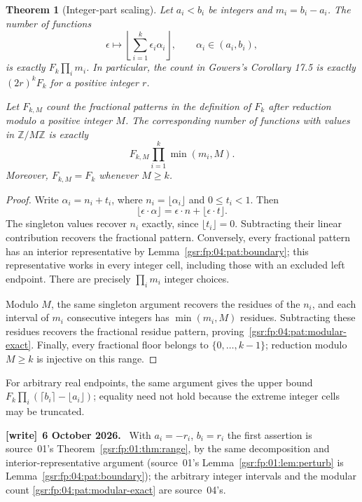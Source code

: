 \documentclass[11pt,letterpaper]{article}
\numberwithin{equation}{section}
\newtheorem{theorem}{Theorem}[section]
\theoremstyle{definition}
\theoremstyle{remark}
\newcommand{\1}{\mathbf 1}
\newenvironment{writenote}[1][]{\par\smallskip\begingroup\small
 \noindent\textbf{[write]}\if\relax\detokenize{#1}\relax\else~\textbf{#1.}\fi\ }%
 {\par\endgroup\smallskip}
\begin{document}
\begin{theorem}[Integer-part scaling]\label{gsr:fp:04:pat:scaling}
Let $a_i<b_i$ be integers and $m_i=b_i-a_i$. The number of functions
\[
 \epsilon\longmapsto\left\lfloor\sum_{i=1}^k\epsilon_i\alpha_i\right\rfloor,
 \qquad \alpha_i\in(a_i,b_i),
\]
is exactly $F_k\prod_i m_i$. In particular, the count in Gowers's
Corollary 17.5 is exactly $(2r)^kF_k$ for a positive integer $r$.

Let $F_{k,M}$ count the fractional patterns in the definition of $F_k$
after reduction modulo a positive integer $M$. The corresponding number
of functions with values in $\mathbb Z/M\mathbb Z$ is exactly
\begin{equation}\label{gsr:fp:04:pat:modular-exact}
 F_{k,M}\prod_{i=1}^k\min(m_i,M).
\end{equation}
Moreover, $F_{k,M}=F_k$ whenever $M\ge k$.
\end{theorem}
\begin{proof}
Write $\alpha_i=n_i+t_i$, where $n_i=\lfloor\alpha_i\rfloor$ and
$0\le t_i<1$. Then
\[
 \lfloor\epsilon\cdot\alpha\rfloor
   =\epsilon\cdot n+\lfloor\epsilon\cdot t\rfloor.
\]
The singleton values recover $n_i$ exactly, since
$\lfloor t_i\rfloor=0$. Subtracting their linear contribution recovers
the fractional pattern. Conversely, every fractional pattern has an
interior representative by Lemma~\ref{gsr:fp:04:pat:boundary}; this representative
works in every integer cell, including those with an excluded left
endpoint. There are precisely $\prod_i m_i$ integer choices.

Modulo $M$, the same singleton argument recovers the residues of the
$n_i$, and each interval of $m_i$ consecutive integers has
$\min(m_i,M)$ residues. Subtracting these residues recovers the
fractional residue pattern, proving~\eqref{gsr:fp:04:pat:modular-exact}.
Finally, every fractional floor belongs to $\{0,\ldots,k-1\}$;
reduction modulo $M\ge k$ is injective on this range.
\end{proof}

For arbitrary real endpoints, the same argument gives the upper bound
$F_k\prod_i(\lceil b_i\rceil-\lfloor a_i\rfloor)$; equality need
not hold because the extreme integer cells may be truncated.
\begin{writenote}[6 October 2026]
With $a_i=-r_i$, $b_i=r_i$ the first assertion is source~01's Theorem~\ref{gsr:fp:01:thm:range}, by the same decomposition and interior-representative argument (source~01's Lemma~\ref{gsr:fp:01:lem:perturb} is Lemma~\ref{gsr:fp:04:pat:boundary}); the arbitrary integer intervals and the modular count \eqref{gsr:fp:04:pat:modular-exact} are source~04's.
\end{writenote}
\end{document}
